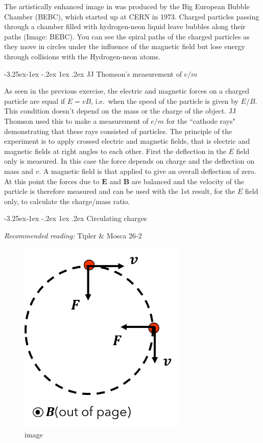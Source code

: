\documentclass[
]{book}
\makeatletter
\renewcommand\subsection{%
\@startsection{subsection}{2}{\z@}%
              {-3.25ex\@plus -1ex \@minus -.2ex}%
              {1ex \@plus .2ex}%
              {\sffamily\bfseries}}
\numberwithin{equation}{section}
\makeatother
\begin{document}
The artistically enhanced image in was produced by the Big European
Bubble Chamber (BEBC), which started up at CERN in 1973. Charged
particles passing through a chamber filled with hydrogen-neon liquid
leave bubbles along their paths (Image: BEBC). You can see the spiral
paths of the charged particles as they move in circles under the
influence of the magnetic field but lose energy through collisions with
the Hydrogen-neon atoms.

\hypertarget{jj-thomsons-measurement-of-em}{%
\subsection{\texorpdfstring{JJ Thomson's measurement of \(e/m\)}{JJ Thomson's measurement of e/m}}\label{jj-thomsons-measurement-of-em}}

As seen in the previous exercise, the electric and magnetic forces on a
charged particle are equal if \(E = vB\), i.e.~when the speed of the
particle is given by \(E/B\). This condition doesn't depend on the mass or
the charge of the object. JJ Thomson used this to make a measurement of
\(e/m\) for the ``cathode rays" demonstrating that these rays consisted of
particles. The principle of the experiment is to apply crossed electric
and magnetic fields, that is electric and magnetic fields at right
angles to each other. First the deflection in the \(E\) field only is
measured. In this case the force depends on charge and the deflection on
mass and \(v\). A magnetic field is that applied to give an overall
deflection of zero. At this point the forces due to \(\mathbf{E}\) and \(\mathbf{B}\) are
balanced and the velocity of the particle is therefore measured and can
be used with the 1st result, for the \(E\) field only, to calculate the
charge/mass ratio.

\hypertarget{circulating-charges}{%
\subsection{Circulating charges}\label{circulating-charges}}

\emph{Recommended reading:} Tipler \& Mosca 26-2

\begin{figure}
\centering
\includegraphics[width=80mm,height=\textheight]{Figures/circular_path.png}
\caption{image}
\end{figure}
\end{document}
